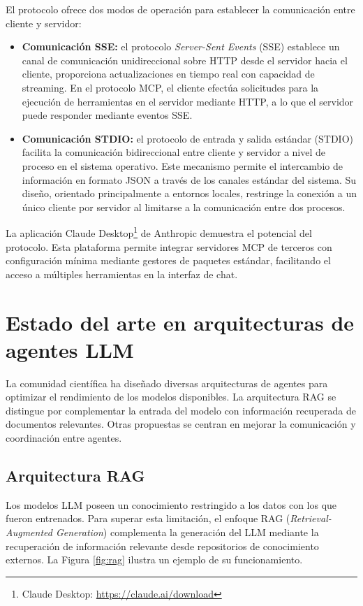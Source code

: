 El protocolo ofrece dos modos de operación para establecer la comunicación entre cliente y servidor:
\begin{itemize}
  \item{\textbf{Comunicación SSE: } el protocolo \textit{Server-Sent Events} (SSE) establece un canal de comunicación unidireccional sobre HTTP desde el servidor hacia el cliente, proporciona actualizaciones en tiempo real con capacidad de streaming. En el protocolo MCP, el cliente efectúa solicitudes para la ejecución de herramientas en el servidor mediante HTTP, a lo que el servidor puede responder mediante eventos SSE.}
\item{\textbf{Comunicación STDIO: } el protocolo de entrada y salida estándar (STDIO) facilita la comunicación bidireccional entre cliente y servidor a nivel de proceso en el sistema operativo. Este mecanismo permite el intercambio de información en formato JSON a través de los canales estándar del sistema. Su diseño, orientado principalmente a entornos locales, restringe la conexión a un único cliente por servidor al limitarse a la comunicación entre dos procesos.}
\end{itemize}
La aplicación Claude Desktop\footnote{Claude Desktop: \url{https://claude.ai/download}} de Anthropic demuestra el potencial del protocolo. Esta plataforma permite integrar servidores MCP de terceros con configuración mínima mediante gestores de paquetes estándar, facilitando el acceso a múltiples herramientas en la interfaz de chat.

\section{Estado del arte en arquitecturas de agentes LLM}
\label{sec:estado_arte}

La comunidad científica ha diseñado diversas arquitecturas de agentes para optimizar el rendimiento de los modelos disponibles. La arquitectura RAG se distingue por complementar la entrada del modelo con información recuperada de documentos relevantes. Otras propuestas se centran en mejorar la comunicación y coordinación entre agentes.

\subsection{Arquitectura RAG}

Los modelos LLM poseen un conocimiento restringido a los datos con los que fueron entrenados. Para superar esta limitación, el enfoque RAG (\textit{Retrieval-Augmented Generation}) complementa la generación del LLM mediante la recuperación de información relevante desde repositorios de conocimiento externos. La Figura \ref{fig:rag} ilustra un ejemplo de su funcionamiento.    

